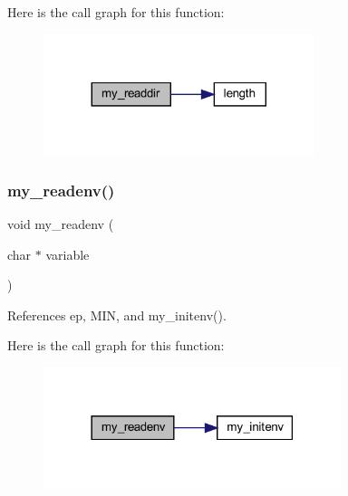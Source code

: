 Here is the call graph for this function\+:
\nopagebreak
\begin{figure}[H]
\begin{center}
\leavevmode
\includegraphics[width=224pt]{C-M__system_8c_a56eb1f4025386fefa96810c8846a75ca_cgraph}
\end{center}
\end{figure}
\mbox{\label{C-M__system_8c_a0114eece06797ba0c5e6f5948841501a}} 
\subsubsection{\texorpdfstring{my\+\_\+readenv()}{my\_readenv()}}
{\footnotesize\ttfamily void my\+\_\+readenv (\begin{DoxyParamCaption}\item[{char $\ast$}]{variable }\end{DoxyParamCaption})}



References ep, M\+IN, and my\+\_\+initenv().

Here is the call graph for this function\+:
\nopagebreak
\begin{figure}[H]
\begin{center}
\leavevmode
\includegraphics[width=246pt]{C-M__system_8c_a0114eece06797ba0c5e6f5948841501a_cgraph}
\end{center}
\end{figure}
\mbox{\label{C-M__system_8c_a93aa717690d60568cf019988f6434ba5}} 
